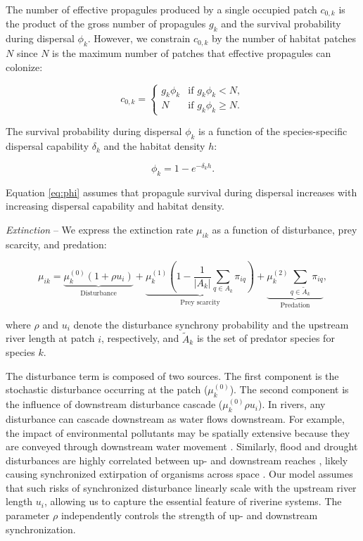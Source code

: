 \documentclass[11pt, class=article, crop=false]{standalone}
\theoremstyle{definition}
\begin{document}
The number of effective propagules produced by a single occupied patch $c_{0, k}$ is the product of the gross number of propagules $g_{k}$ and the survival probability during dispersal $\phi_k$.
However, we constrain $c_{0, k}$ by the number of habitat patches $N$ since $N$ is the maximum number of patches that effective propagules can colonize:

\begin{equation}
    c_{0, k} = 
    \begin{cases}
        g_k \phi_k & \text{if $g_k \phi_k < N$},\\
        N & \text{if $g_k \phi_k \ge N$}.
    \end{cases}
    \label{eq:c0-prod}
\end{equation}

The survival probability during dispersal $\phi_k$ is a function of the species-specific dispersal capability $\delta_k$ and the habitat density $h$:

\begin{equation}
    \phi_k = 1 - e^{-\delta_k h}.
    \label{eq:phi}
\end{equation}

Equation \ref{eq:phi} assumes that propagule survival during dispersal increases with increasing dispersal capability and habitat density.

\textit{Extinction} -- 
We express the extinction rate $\mu_{ik}$ as a function of disturbance, prey scarcity, and predation:

\begin{equation}
    \mu_{ik} = 
        \underbrace{\mu_{k}^{(0)} (1 + \rho u_i)}_{\text{Disturbance}} + 
        \underbrace{\mu_{k}^{(1)} \left(1 - \frac{1}{|A_k|}\sum_{q \in A_k} \pi_{iq} \right)}_{\text{Prey scarcity}} + 
        \underbrace{\mu_{k}^{(2)} \sum_{q \in \tilde{A}_k} \pi_{iq}}_{\text{Predation}},
    \label{eq:extn}
\end{equation}

where $\rho$ and $u_i$ denote the disturbance synchrony probability and the upstream river length at patch $i$, respectively, and $\tilde{A}_k$ is the set of predator species for species $k$.

The disturbance term is composed of two sources.
The first component is the stochastic disturbance occurring at the patch ($\mu_{k}^{(0)}$).
The second component is the influence of downstream disturbance cascade ($\mu_{k}^{(0)} \rho u_i$).
In rivers, any disturbance can cascade downstream as water flows downstream.
For example, the impact of environmental pollutants may be spatially extensive because they are conveyed through downstream water movement \citep{massoudieh_biogeochemical_2010}.
Similarly, flood and drought disturbances are highly correlated between up- and downstream reaches \citep{swanson_flood_1998, nakamura_disturbance_2000, sarremejane_drought_2021}, likely causing synchronized extirpation of organisms across space \citep{larsen_geography_2021}.
Our model assumes that such risks of synchronized disturbance linearly scale with the upstream river length $u_i$, allowing us to capture the essential feature of riverine systems.
The parameter $\rho$ independently controls the strength of up- and downstream synchronization.
\end{document}
